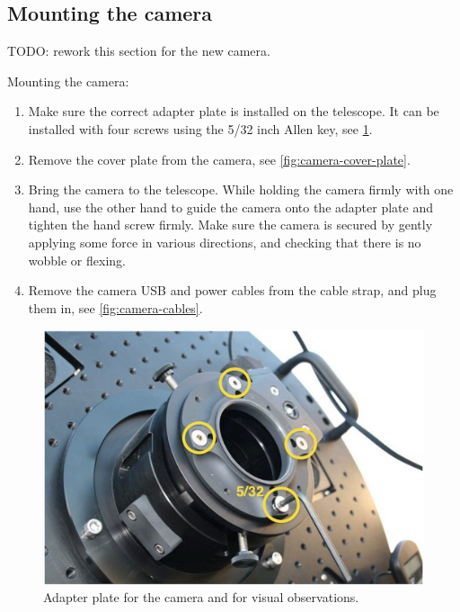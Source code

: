 \documentclass[a4paper, 11pt, fleqn]{memoir}
\begin{document}
\subsection{Mounting the camera}
\label{sec:install-camera}

TODO: rework this section for the new camera.

Mounting the camera:
\begin{enumerate}
    \item
          Make sure the correct adapter plate is installed on the telescope. It can be installed with four screws using the 5/32 inch Allen key, see \cref{fig:adapter-plate-eyepiece}.
    \item
          Remove the cover plate from the camera, see \cref{fig:camera-cover-plate}.
    \item
          Bring the camera to the telescope.
          While holding the camera firmly with one hand, use the other hand to guide the camera onto the adapter plate and tighten the hand screw firmly. Make sure the camera is secured by gently applying some force in various directions, and checking that there is no wobble or flexing.
    \item
          Remove the camera USB and power cables from the cable strap, and plug them in, see \cref{fig:camera-cables}.
\end{enumerate}

\begin{figure}
    \centering
    \includegraphics[width=0.5 \textwidth]{adapter-visual}
    \caption{Adapter plate for the camera and for visual observations.}
    \label{fig:adapter-plate-eyepiece}
\end{figure}
\end{document}
